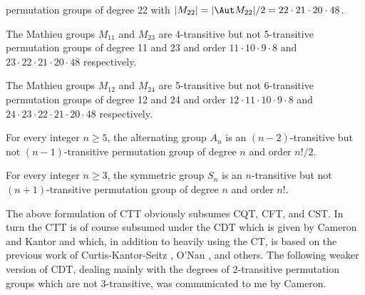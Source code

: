 permutation groups of degree 
{\rm22} 
with $|M_{22}|=|\Aut M_{22}|/2 = 22\cdot 21\cdot 20\cdot 
48$.
\item
The Mathieu groups $M_{11}$ and $M_{23}$ are 
{\rm4}-transitive but not
{\rm5}-transitive permutation groups of degree {\rm11} and 
{\rm23} and order
$11\cdot 10\cdot 9\cdot 8$ and $23\cdot 22\cdot 21\cdot 
20\cdot 48$ 
respectively.
\item
The Mathieu groups $M_{12}$ and $M_{24}$ are 
{\rm5}-transitive but not
{\rm6}-transitive permutation groups of degree {\rm12} and 
{\rm24} and order
$12\cdot 11\cdot 10\cdot 9\cdot 8$ and 
$24\cdot 23\cdot 22\cdot 21\cdot 20\cdot 48$ respectively.
\item
For every integer $n\ge 5$, the alternating group $A_n$ is 
an
$(n-2)$-transitive but not $(n-1)$-transitive permutation 
group
of degree $n$ and order $n!/2$.
\item
For every integer $n\ge 3$, the symmetric group $S_n$ is an
$n$-transitive but not $(n+1)$-transitive permutation group
of degree $n$ and order $n!$.
\endroster
\endproclaim 

The above formulation of CTT obviously subsumes CQT, CFT, 
and CST.
In turn the CTT is of course subsumed under the CDT which 
is given by
Cameron \cite{C} and Kantor \cite{K2} and which, in 
addition to heavily using
the CT, is based on the previous work of 
Curtis-Kantor-Seitz \cite{CKS},
O'Nan \cite{O}, and others. The following weaker version 
of CDT, dealing mainly
with the degrees of 2-transitive permutation groups which 
are not
3-transitive, was communicated to me by Cameron.

